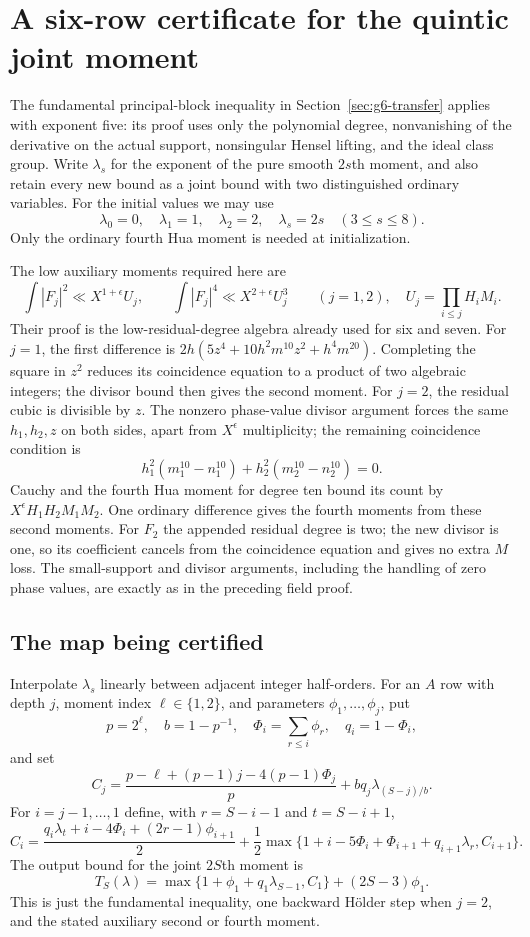 \documentclass[11pt,reqno]{amsart}
\numberwithin{equation}{section}
\theoremstyle{definition}
\begin{document}
\section{A six-row certificate for the quintic joint moment}
\label{sec:k5-certificate}

The fundamental principal-block inequality in Section~\ref{sec:g6-transfer}
applies with exponent five: its proof uses only the polynomial degree,
nonvanishing of the derivative on the actual support, nonsingular Hensel
lifting, and the ideal class group.  Write $\lambda_s$ for the exponent of
the pure smooth $2s$th moment, and also retain every new bound as a joint
bound with two distinguished ordinary variables.
For the initial values we may use
\[
 \lambda_0=0,\quad\lambda_1=1,\quad\lambda_2=2,\quad
 \lambda_s=2s\quad(3\le s\le8).
\]
Only the ordinary fourth Hua moment is needed at initialization.

The low auxiliary moments required here are
\[
 \int |F_j|^2\ll X^{1+\epsilon}U_j,\qquad
 \int |F_j|^4\ll X^{2+\epsilon}U_j^3\qquad(j=1,2),
 \quad U_j=\prod_{i\le j}H_iM_i.
\]
Their proof is the low-residual-degree algebra already used for six and seven.
For $j=1$, the first difference is
$2h(5z^4+10h^2m^{10}z^2+h^4m^{20})$.
Completing the square in $z^2$ reduces its coincidence equation to a
product of two algebraic integers; the divisor bound then gives the
second moment.  For $j=2$, the residual cubic is divisible by $z$.
The nonzero phase-value divisor argument forces the same $h_1,h_2,z$ on
both sides, apart from $X^\epsilon$ multiplicity; the remaining coincidence
condition is
\[
 h_1^2(m_1^{10}-n_1^{10})+h_2^2(m_2^{10}-n_2^{10})=0.
\]
Cauchy and the fourth Hua moment for degree ten bound its count by
$X^\epsilon H_1H_2M_1M_2$.
One ordinary difference gives the fourth moments from these second moments.
For $F_2$ the appended residual degree is two; the new divisor is one,
so its coefficient cancels from the coincidence equation and gives no
extra $M$ loss.  The small-support and divisor arguments, including the
handling of zero phase values, are exactly as in the preceding field proof.

\subsection{The map being certified}
Interpolate $\lambda_s$ linearly between adjacent integer half-orders.
For an $A$ row with depth $j$, moment index $\ell\in\{1,2\}$, and
parameters $\phi_1,\ldots,\phi_j$, put
\[
 p=2^\ell,\quad b=1-p^{-1},\quad
 \Phi_i=\sum_{r\le i}\phi_r,\quad q_i=1-\Phi_i,
\]
and set
\[
 C_j=\frac{p-\ell+(p-1)j-4(p-1)\Phi_j}{p}
                +bq_j\lambda_{(S-j)/b}.
\]
For $i=j-1,\ldots,1$ define, with $r=S-i-1$ and $t=S-i+1$,
\[
 C_i=\frac{q_i\lambda_t+i-4\Phi_i+(2r-1)\phi_{i+1}}2
       +\frac12\max\{1+i-5\Phi_i+\Phi_{i+1}
                         +q_{i+1}\lambda_r,C_{i+1}\}.
\]
The output bound for the joint $2S$th moment is
\[
 T_S(\lambda)=
 \max\{1+\phi_1+q_1\lambda_{S-1},C_1\}+(2S-3)\phi_1.
\]
This is just the fundamental inequality, one backward H\"older step when
$j=2$, and the stated auxiliary second or fourth moment.
\end{document}
